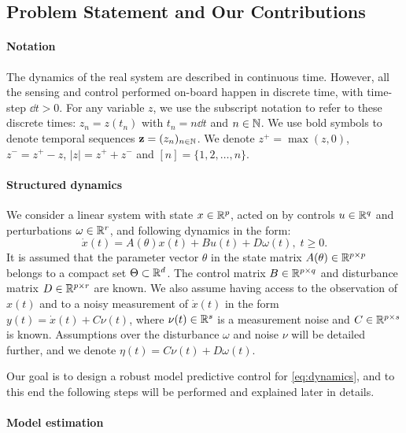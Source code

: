 \subsection{Problem Statement and Our Contributions}

\paragraph{Notation}

The dynamics of the real system are described in continuous time. However, all the sensing and control performed on-board happen in discrete time, with time-step $\dd t>0$. For any variable $z$, we use the subscript notation to refer to these discrete times: $z_n = z(t_n)$ with $t_n = n\dd t$ and $n\in\mathbb{N}$. We use bold symbols to denote temporal sequences $\mathbf{z} = (z_n)_{n\in\mathbb{N}}$. We denote $z^+ = \max(z,0)$, $z^- = z^+-z$, $|z| = z^++z^-$ and $[n]=\{1,2,\dots, n\}$.

\paragraph{Structured dynamics}
We consider a linear system with state $x\in\mathbb{R}^p$, acted on by controls $u\in\mathbb{R}^q$ and perturbations $\omega\in\mathbb{R}^r$, and following dynamics in the form:
\begin{equation}
\label{eq:dynamics}
\dot{x}(t)=A(\theta)x(t) + B u(t) + D \omega(t),\;t\geq0.
\end{equation}
It is assumed that the parameter vector $\theta$ in the state matrix $A(\theta)\in\mathbb{R}^{p\times p}$ belongs to a compact set $\Theta \subset \mathbb{R}^d$. The control matrix $B\in\mathbb{R}^{p\times q}$ and disturbance matrix $D\in\mathbb{R}^{p\times r}$ are known. We also assume having access to the observation of $x(t)$ and to a noisy measurement of $\dot{x}(t)$ in the form $y(t)=\dot{x}(t) + C\nu(t)$, where $\nu(t)\in\mathbb{R}^s$ is a measurement noise and $C\in\mathbb{R}^{p\times s}$ is known. Assumptions over the disturbance $\omega$ and noise $\nu$ will be detailed further, and we denote $\eta(t) = C\nu(t) + D\omega(t)$. 

Our goal is to design a robust model predictive control for \eqref{eq:dynamics}, and to this end the following steps will be performed and explained later in details.

\paragraph{Model estimation}


